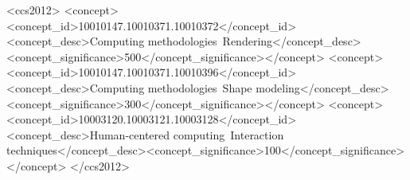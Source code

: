 \documentclass[acmtog, anonymous, review]{acmart}
\theoremstyle{plain}
\theoremstyle{definition}
\begin{document}
\begin{CCSXML}
<ccs2012>
<concept><concept_id>10010147.10010371.10010372</concept_id><concept_desc>Computing methodologies~Rendering</concept_desc><concept_significance>500</concept_significance></concept>
<concept><concept_id>10010147.10010371.10010396</concept_id><concept_desc>Computing methodologies~Shape modeling</concept_desc><concept_significance>300</concept_significance></concept>
<concept><concept_id>10003120.10003121.10003128</concept_id><concept_desc>Human-centered computing~Interaction techniques</concept_desc><concept_significance>100</concept_significance></concept>
</ccs2012>
\end{CCSXML}


\end{document}
